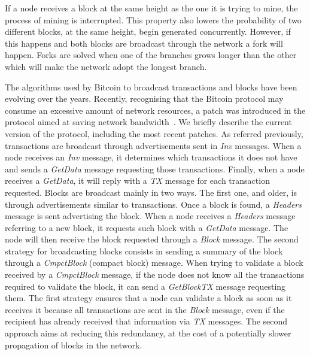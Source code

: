 \documentclass{dads}   %
\begin{document}
If a node receives a block at the same height as the one it is trying to mine, the process of mining is interrupted. This property also lowers the probability of two different blocks, at the same height, begin generated concurrently. However, if this happens and both blocks are broadcast through the network a fork will happen. Forks are solved when one of the branches grows longer than the other which will make the network adopt the longest branch. 


The algorithms used by Bitcoin to broadcast transactions and blocks have been evolving over the years. Recently, recognising that the Bitcoin protocol may consume an excessive amount of network resources, a patch was introduced in the protocol aimed at saving network bandwidth~\cite{bip152}. We briefly describe the current version of the protocol, including the most recent patches. As referred previously, transactions are broadcast through advertisements sent in \textsl{Inv} messages. When a node receives an \textsl{Inv} message, it determines which transactions it does not have and sends a \textsl{GetData} message requesting those transactions. Finally, when a node receives a \textsl{GetData}, it will reply with a \textsl{TX} message for each transaction requested. Blocks are broadcast mainly in two ways. The first one, and older, is through advertisements similar to transactions. Once a block is found, a \textsl{Headers} message is sent advertising the block. When a node receives a \textsl{Headers} message referring to a new block, it requests such block with a \textsl{GetData} message. The node will then receive the block requested through a \textsl{Block} message. The second strategy for broadcasting blocks consists in sending a summary of the block through a \textsl{CmpctBlock} (compact block) message. When trying to validate a block received by a \textsl{CmpctBlock} message, if the node does not know all the transactions required to validate the block, it can send a \textsl{GetBlockTX} message requesting them. The first strategy ensures that a node can validate a block as soon as it receives it because all transactions are sent in the \textsl{Block} message, even if the recipient has already received that information via \textsl{TX} messages. The second approach aims at reducing this redundancy, at the cost of a potentially slower propagation of blocks in the network.
\end{document}

